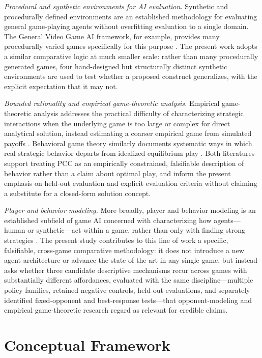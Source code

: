 \documentclass[journal]{IEEEtran}
\begin{document}
\textit{Procedural and synthetic environments for AI evaluation.} Synthetic and procedurally defined environments are an established methodology for evaluating general game-playing agents without overfitting evaluation to a single domain. The General Video Game AI framework, for example, provides many procedurally varied games specifically for this purpose \cite{perezliebana2019}. The present work adopts a similar comparative logic at much smaller scale: rather than many procedurally generated games, four hand-designed but structurally distinct synthetic environments are used to test whether a proposed construct generalizes, with the explicit expectation that it may not.

\textit{Bounded rationality and empirical game-theoretic analysis.} Empirical game-theoretic analysis addresses the practical difficulty of characterizing strategic interactions when the underlying game is too large or complex for direct analytical solution, instead estimating a coarser empirical game from simulated payoffs \cite{wellman2006}. Behavioral game theory similarly documents systematic ways in which real strategic behavior departs from idealized equilibrium play \cite{camerer2003}. Both literatures support treating PCC as an empirically constrained, falsifiable description of behavior rather than a claim about optimal play, and inform the present emphasis on held-out evaluation and explicit evaluation criteria without claiming a substitute for a closed-form solution concept.

\textit{Player and behavior modeling.} More broadly, player and behavior modeling is an established subfield of game AI concerned with characterizing how agents---human or synthetic---act within a game, rather than only with finding strong strategies \cite{yannakakis2018}. The present study contributes to this line of work a specific, falsifiable, cross-game comparative methodology: it does not introduce a new agent architecture or advance the state of the art in any single game, but instead asks whether three candidate descriptive mechanisms recur across games with substantially different affordances, evaluated with the same discipline---multiple policy families, retained negative controls, held-out evaluations, and separately identified fixed-opponent and best-response tests---that opponent-modeling and empirical game-theoretic research regard as relevant for credible claims.

\section{Conceptual Framework}
\end{document}
